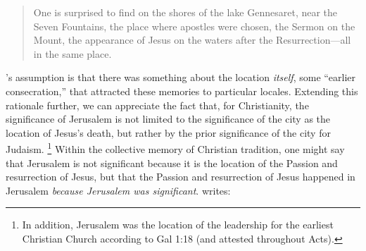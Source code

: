 \begin{quote}
    One is surprised to find on the shores of the lake Gennesaret, near the Seven Fountains, the place where apostles were chosen, the Sermon on the Mount, the appearance of Jesus on the waters after the Resurrection---all in the same place.%
        \autocite[220]{halbwachs1992}
\end{quote}  
\noindent
\halbwachs's assumption is that there was something about the location \emph{itself}, some ``earlier consecration,''%
    \autocite[220]{halbwachs1992}
that attracted these memories to particular locales. Extending this rationale further, we can appreciate the fact that, for Christianity, the significance of Jerusalem is not limited to the significance of the city as the location of Jesus's death, but rather by the prior significance of the city for Judaism.%
    \footnote{%
        In addition, Jerusalem was the location of the leadership for the earliest Christian Church according to Gal 1:18 (and attested throughout Acts).}
%
Within the collective memory of Christian tradition, one might say that Jerusalem is not significant because it is the location of the Passion and resurrection of Jesus, but that the Passion and resurrection of Jesus happened in Jerusalem \emph{because Jerusalem was significant}. \halbwachs writes:  


